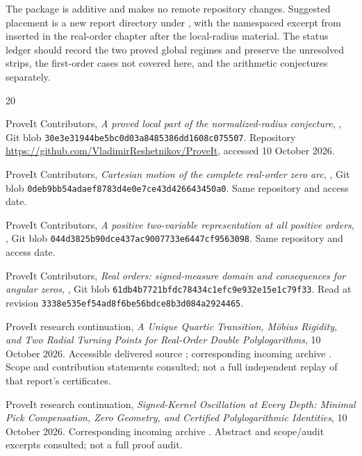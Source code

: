 \documentclass[11pt,letterpaper]{article}
\numberwithin{equation}{section}
\theoremstyle{definition}
\theoremstyle{remark}
\begin{document}
The package is additive and makes no remote repository changes.
Suggested placement is a new report directory under
, with the namespaced excerpt
from  inserted in the real-order chapter after the
local-radius material. The status ledger should record the two proved
global regimes and preserve the unresolved strips, the first-order
cases not covered here, and the arithmetic conjectures separately.

\begin{thebibliography}{20}
\small\raggedright
{}
ProveIt Contributors,
\emph{A proved local part of the normalized-radius conjecture},
,
Git blob \texttt{30e3e31944be5bc0d03a8485386dd1608c075507}.
Repository \url{https://github.com/VladimirReshetnikov/ProveIt},
accessed 10 October 2026.

ProveIt Contributors,
\emph{Cartesian motion of the complete real-order zero arc},
,
Git blob \texttt{0deb9bb54adaef8783d4e0e7ce43d426643450a0}.
Same repository and access date.

ProveIt Contributors,
\emph{A positive two-variable representation at all positive orders},
,
Git blob \texttt{044d3825b90dce437ac9007733e6447cf9563098}.
Same repository and access date.

ProveIt Contributors,
\emph{Real orders: signed-measure domain and consequences for angular zeros},
,
Git blob \texttt{61db4b7721bfdc78434c1efc9e932e15e1c79f33}.
Read at revision
\texttt{3338e535ef54ad8f6be56bdce8b3d084a2924465}.

ProveIt research continuation,
\emph{A Unique Quartic Transition, M\"obius Rigidity, and Two Radial
Turning Points for Real-Order Double Polylogarithms},
10 October 2026. Accessible delivered source
; corresponding incoming
archive .
Scope and contribution statements consulted; not a full independent
replay of that report's certificates.

ProveIt research continuation,
\emph{Signed-Kernel Oscillation at Every Depth: Minimal Pick Compensation,
Zero Geometry, and Certified Polylogarithmic Identities},
10 October 2026. Corresponding incoming archive
. Abstract and scope/audit excerpts
consulted; not a full proof audit.


\end{thebibliography}
\end{document}
